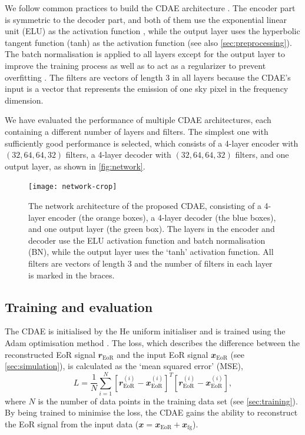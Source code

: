 \documentclass[letters,a4paper,fleqn,usenatbib]{mnras}
\newcommand{\R}[1]{\mathrm{#1}}
\newcommand{\B}[1]{\mathbfit{#1}}
\begin{document}
We follow common practices to build the CDAE architecture
\citep[e.g.,][]{suganuma2018,geron2017}.
The encoder part is symmetric to the decoder part, and both of them
use the exponential linear unit (ELU) as the activation function
\citep{clevert2016},
while the output layer uses the hyperbolic tangent function (tanh)
as the activation function (see also \autoref{sec:preprocessing}).
The batch normalisation is applied to all layers except for the output
layer to improve the training process as well as to act as a regularizer
to prevent overfitting \citep{ioffe2015}.
{\color{cyan}%
The filters are vectors of length 3 in all layers because the CDAE's
input is a vector that represents the emission of one sky pixel in the
frequency dimension.}

We have evaluated the performance of multiple CDAE architectures, each
containing a different number of layers and filters.
The simplest one with sufficiently good performance is selected,
which consists of a 4-layer encoder with $(32,64,64,32)$ filters,
a 4-layer decoder with $(32,64,64,32)$ filters, and one output layer,
as shown in \autoref{fig:network}.

\begin{figure}
  \centering
  \texttt{[image: network-crop]}
  \caption{\label{fig:network}%
    The network architecture of the proposed CDAE, consisting of a
    4-layer encoder (the orange boxes), a 4-layer decoder (the blue
    boxes), and one output layer (the green box).
    The layers in the encoder and decoder use the ELU activation
    function and batch normalisation (BN), while the output layer uses
    the `tanh' activation function.
    All filters are vectors of length 3 and the number of filters in
    each layer is marked in the braces.
  }
\end{figure}


\subsection{Training and evaluation}
\label{sec:train-eval}

The CDAE is initialised by the He uniform initialiser \citep{he2015}
and is trained using the Adam optimisation method \citep{kingma2015}.
{\color{cyan}%
The loss, which describes the difference between the reconstructed EoR
signal $\B{r}_{\R{EoR}}$ and the input EoR signal $\B{x}_{\R{EoR}}$
(see \autoref{sec:simulation}),
is calculated as the `mean squared error' (MSE),
\begin{equation}
  \label{eq:loss}
  L = \frac{1}{N} \sum_{i=1}^{N}
    \left[ \B{r}_{\R{EoR}}^{(i)} - \B{x}_{\R{EoR}}^{(i)} \right]^T
    \left[ \B{r}_{\R{EoR}}^{(i)} - \B{x}_{\R{EoR}}^{(i)} \right],
\end{equation}
where $N$ is the number of data points in the training data set
(see \autoref{sec:training}).} %
By being trained to minimise the loss, the CDAE gains the ability to
reconstruct the EoR signal from the input data
($\B{x} = \B{x}_{\R{EoR}} + \B{x}_{\R{fg}}$).
\end{document}
